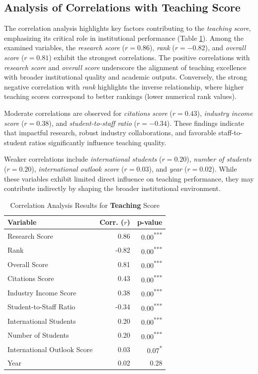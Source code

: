 \documentclass[sigconf]{acmart}
\begin{document}
\subsection{Analysis of Correlations with Teaching Score}

The correlation analysis highlights key factors contributing to the \textit{teaching score}, emphasizing its critical role in institutional performance (Table \ref{tab:correlation_teaching}). Among the examined variables, the \textit{research score} ($r = 0.86$), \textit{rank} ($r = -0.82$), and \textit{overall score} ($r = 0.81$) exhibit the strongest correlations. The positive correlations with \textit{research score} and \textit{overall score} underscore the alignment of teaching excellence with broader institutional quality and academic outputs. Conversely, the strong negative correlation with \textit{rank} highlights the inverse relationship, where higher teaching scores correspond to better rankings (lower numerical rank values).

Moderate correlations are observed for \textit{citations score} ($r = 0.43$), \textit{industry income score} ($r = 0.38$), and \textit{student-to-staff ratio} ($r = -0.34$). These findings indicate that impactful research, robust industry collaborations, and favorable staff-to-student ratios significantly influence teaching quality.

Weaker correlations include \textit{international students} ($r = 0.20$), \textit{number of students} ($r = 0.20$), \textit{international outlook score} ($r = 0.03$), and \textit{year} ($r = 0.02$). While these variables exhibit limited direct influence on teaching performance, they may contribute indirectly by shaping the broader institutional environment.

\begin{table}[h!]
	\centering
	\caption{Correlation Analysis Results for \textbf{Teaching} Score}
	\label{tab:correlation_teaching}
	\begin{tabular}{|l|r|r|}
		\hline
		\textbf{Variable} & \textbf{Corr. ($r$)} & \textbf{p-value} \\
		\hline
		Research Score & 0.86 & 0.00\textsuperscript{***} \\
		Rank & -0.82 & 0.00\textsuperscript{***} \\
		Overall Score & 0.81 & 0.00\textsuperscript{***} \\
		Citations Score & 0.43 & 0.00\textsuperscript{***} \\
		Industry Income Score & 0.38 & 0.00\textsuperscript{***} \\
		Student-to-Staff Ratio & -0.34 & 0.00\textsuperscript{***} \\
		International Students & 0.20 & 0.00\textsuperscript{***} \\
		Number of Students & 0.20 & 0.00\textsuperscript{***} \\
		International Outlook Score & 0.03 & 0.07\textsuperscript{*} \\
		Year & 0.02 & 0.28 \\
		\hline
	\end{tabular}
\end{table}
\end{document}
